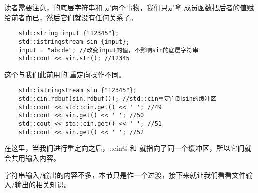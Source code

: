 读者需要注意，\lstinline@sin@ 的底层字符串和 \lstinline@input@ 是两个事物，我们只是拿 \lstinline@str@ 成员函数把后者的值赋给前者而已，然后它们就没有任何关系了。
\begin{lstlisting}
    std::string input {"12345"};
    std::istringstream sin {input};
    input = "abcde"; //改变input的值，不影响sin的底层字符串
    std::cout << sin.str(); //12345
\end{lstlisting}
这个与我们此前用的 \lstinline@rdbuf@ 重定向操作不同。
\begin{lstlisting}
    std::istringstream sin {"12345"};
    std::cin.rdbuf(sin.rdbuf()); //std::cin重定向到sin的缓冲区
    std::cout << std::cin.get() << ' '; //49
    std::cout << sin.get() << ' '; //50
    std::cout << std::cin.get() << ' '; //51
    std::cout << sin.get() << ' '; //52
\end{lstlisting}
在这里，当我们进行重定向之后，\lstinline@std::cin@ 和 \lstinline@sin@ 就指向了同一个缓冲区，所以它们就会共用输入内容。\par
字符串输入/输出的内容不多，本节只是作一个过渡，接下来就让我们看看文件输入/输出的相关知识。\par\pagebreak

